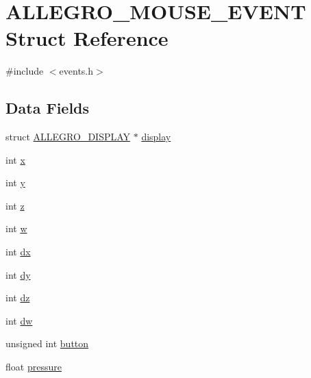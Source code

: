 \hypertarget{struct_a_l_l_e_g_r_o___m_o_u_s_e___e_v_e_n_t}{}\section{A\+L\+L\+E\+G\+R\+O\+\_\+\+M\+O\+U\+S\+E\+\_\+\+E\+V\+E\+NT Struct Reference}
\label{struct_a_l_l_e_g_r_o___m_o_u_s_e___e_v_e_n_t}


{\ttfamily \#include $<$events.\+h$>$}

\subsection*{Data Fields}
\begin{DoxyCompactItemize}
\item 
struct \hyperlink{display_8h_a7516185aa39c086f4bc62bd4bf5858bf}{A\+L\+L\+E\+G\+R\+O\+\_\+\+D\+I\+S\+P\+L\+AY} $\ast$ \hyperlink{struct_a_l_l_e_g_r_o___m_o_u_s_e___e_v_e_n_t_a017a8661b70bd4ef274af58fa080fea6}{display}
\item 
int \hyperlink{struct_a_l_l_e_g_r_o___m_o_u_s_e___e_v_e_n_t_ac0dab9fcd5e7da2b78da85b43f05361b}{x}
\item 
int \hyperlink{struct_a_l_l_e_g_r_o___m_o_u_s_e___e_v_e_n_t_a5568be47e087feee311cb1d5bbb3617e}{y}
\item 
int \hyperlink{struct_a_l_l_e_g_r_o___m_o_u_s_e___e_v_e_n_t_a32b3ba13557a8cd57153d608a84e8127}{z}
\item 
int \hyperlink{struct_a_l_l_e_g_r_o___m_o_u_s_e___e_v_e_n_t_a9b05bafe7d725f89f77a12e07af804af}{w}
\item 
int \hyperlink{struct_a_l_l_e_g_r_o___m_o_u_s_e___e_v_e_n_t_ad0247c731c8881a2bd3fc64f62f1bfc3}{dx}
\item 
int \hyperlink{struct_a_l_l_e_g_r_o___m_o_u_s_e___e_v_e_n_t_a42aa9f1c60c11d39fb91797bf0af5285}{dy}
\item 
int \hyperlink{struct_a_l_l_e_g_r_o___m_o_u_s_e___e_v_e_n_t_a587bd1020e470eed11c5f61d6e6f5bb4}{dz}
\item 
int \hyperlink{struct_a_l_l_e_g_r_o___m_o_u_s_e___e_v_e_n_t_ab299ccebd862406672d1bbcea8b90de6}{dw}
\item 
unsigned int \hyperlink{struct_a_l_l_e_g_r_o___m_o_u_s_e___e_v_e_n_t_a8d2bafffdf44dad7d21632fe8794803e}{button}
\item 
float \hyperlink{struct_a_l_l_e_g_r_o___m_o_u_s_e___e_v_e_n_t_aa8da708aedfdca4aab9f58eb9651363f}{pressure}
\end{DoxyCompactItemize}


